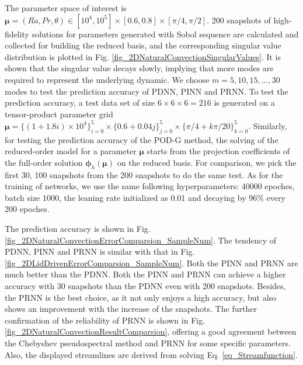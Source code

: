 \documentclass[preprint, 10pt]{elsarticle}
\begin{document}
The parameter space of interest is $\pmb{\mu}=(Ra, Pr, \theta) \in [10^4, 10^5] \times [0.6, 0.8] \times[\pi/4, \pi/2]$. 200 snapshots of high-fidelity solutions for parameters generated with Sobol sequence are calculated and collected for building the reduced basis, and the corresponding singular value distribution is plotted in Fig. \ref{fig_2DNaturalConvectionSingularValues}. It is shown that the singular value decays slowly, implying that more modes are required to represent the underlying dynamic. We choose $m=5, 10, 15,...,30$ modes to test the prediction accuracy of PDNN, PINN and PRNN.
To test the prediction accuracy, a test data set of size $6 \times 6 \times 6=216$ is generated on a tensor-product parameter grid $\pmb{\mu}=\{(1+ 1.8i)\times 10^4\}_{i=0}^{5} \times \{0.6+ 0.04j\}_{j=0}^{5} \times \{\pi/4+ k\pi/20\}_{k=0}^{5}$.
Similarly, for testing the prediction accuracy of the POD-G method, the solving of the reduced-order model for a parameter $\pmb{\mu}$ starts from the projection coefficients of the full-order solution $\pmb{\phi}_h \left( \pmb{\mu} \right)$ on the reduced basis.
For comparison, we pick the first 30, 100 snapshots from the 200 snapshots to do the same test. As for the training of networks, we use the same following hyperparameters: 40000 epoches, batch size 1000, the leaning rate initialized as 0.01 and decaying by 96\% every 200 epoches.

The prediction accuracy is shown in Fig. \ref{fig_2DNaturalConvectionErrorComparsion_SampleNum}. The tendency of PDNN, PINN and PRNN is similar with that in Fig. \ref{fig_2DLidDrivenErrorComparsion_SampleNum}. Both the PINN and PRNN are much better than the PDNN.  Both the PINN and PRNN can achieve a higher accuracy with 30 snapshots than the PDNN even with 200 snapshots. Besides, the PRNN is the best choice, as it not only enjoys a high accuracy, but also shows an improvement with the increase of the snapshots. The further confirmation of the reliability of PRNN is shown in Fig. \ref{fig_2DNaturalConvectionResultComparsion}, offering a good agreement between the Chebyshev pseudospectral method and PRNN for some specific parameters. Also, the displayed streamlines are derived from solving Eq. \ref{eq_Streamfunction}.

\end{document}

